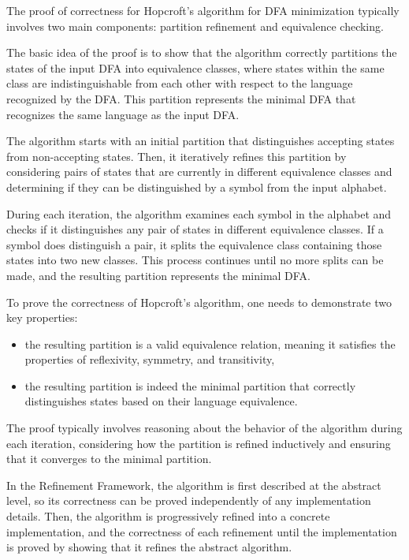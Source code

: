 \documentclass[12pt, a4 paper]{article}
\theoremstyle{definition}
\begin{document}
The proof of correctness for Hopcroft's algorithm for DFA minimization typically involves two main components: partition refinement and equivalence checking.

The basic idea of the proof is to show that the algorithm correctly partitions the states of the input DFA into equivalence classes, where states within the same class are indistinguishable from each other with respect to the language recognized by the DFA. This partition represents the minimal DFA that recognizes the same language as the input DFA.

The algorithm starts with an initial partition that distinguishes accepting states from non-accepting states. Then, it iteratively refines this partition by considering pairs of states that are currently in different equivalence classes and determining if they can be distinguished by a symbol from the input alphabet.

During each iteration, the algorithm examines each symbol in the alphabet and checks if it distinguishes any pair of states in different equivalence classes. If a symbol does distinguish a pair, it splits the equivalence class containing those states into two new classes. This process continues until no more splits can be made, and the resulting partition represents the minimal DFA.

To prove the correctness of Hopcroft's algorithm, one needs to demonstrate two key properties:
\begin{itemize}
    \item the resulting partition is a valid equivalence relation, meaning it satisfies the properties of reflexivity, symmetry, and transitivity,
    \item the resulting partition is indeed the minimal partition that correctly distinguishes states based on their language equivalence.
\end{itemize}

The proof typically involves reasoning about the behavior of the algorithm during each iteration, considering how the partition is refined inductively and ensuring that it converges to the minimal partition.

In the Refinement Framework, the algorithm is first described at the abstract level, so its correctness can be proved independently of any implementation details. Then, the algorithm is progressively refined into a concrete implementation, and the correctness of each refinement until the implementation is proved by showing that it refines the abstract algorithm.
\end{document}
